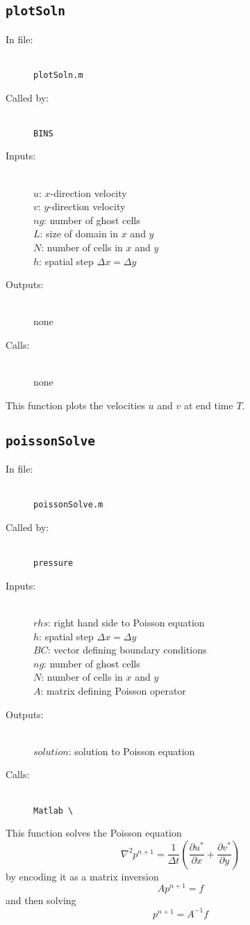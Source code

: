\documentclass[12pt]{article}
\begin{document}
\subsection{\texttt{plotSoln}}
\begin{description}
\item[In file:] \hfill \\ \texttt{plotSoln.m}
\item[Called by:] \hfill \\ \texttt{BINS}
\item[Inputs:] \hfill \\  $u$: $x$-direction velocity \\ $v$: $y$-direction velocity\\ $ng$: number of ghost cells \\ $L$: size of domain in $x$ and $y$ \\ $N$: number of cells in $x$ and $y$ \\ $h$: spatial step $\Delta x = \Delta y$ 
\item[Outputs:] \hfill \\ none
\item[Calls:] \hfill \\ none
\end{description}
This function plots the velocities $u$ and $v$ at end time $T$.

\subsection{\texttt{poissonSolve}}
\begin{description}
\item[In file:] \hfill \\ \texttt{poissonSolve.m}
\item[Called by:] \hfill \\ \texttt{pressure}
\item[Inputs:] \hfill \\  $rhs$: right hand side to Poisson equation \\ $h$: spatial step $\Delta x = \Delta y$ \\ $BC$: vector defining boundary conditions \\ $ng$: number of ghost cells \\ $N$: number of cells in $x$ and $y$ \\ $A$: matrix defining Poisson operator
\item[Outputs:] \hfill \\ $solution$: solution to Poisson equation
\item[Calls:] \hfill \\ \texttt{Matlab \textbackslash}
\end{description}
This function solves the Poisson equation
\[ \nabla^2 p^{n+1} = \frac{1}{\Delta t}\left( \frac{\partial u^*}{\partial x} + \frac{\partial v^*}{\partial y} \right) \]
by encoding it as a matrix inversion
\[ Ap^{n+1} = f\]
and then solving
\[ p^{n+1} = A^{-1}f\]
\end{document}
